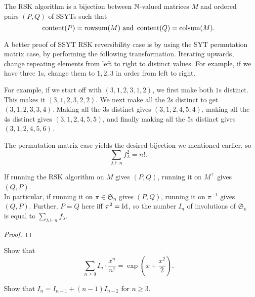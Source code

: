 	\begin{ftheo}
		The RSK algorithm is a bijection between $\mathbb{N}$-valued matrices $M$ and ordered pairs $(P,Q)$ of SSYTs such that
		\[ \operatorname{content}(P) = \operatorname{rowsum}(M) \text{ and } \operatorname{content}(Q) = \operatorname{colsum}(M). \] 
	\end{ftheo}

	A better proof of SSYT RSK reversibility case is by using the SYT permutation matrix case, by performing the following transformation. Iterating upwards, change repeating elements from left to right to distinct values. For example, if we have three $1$s, change them to $1,2,3$ in order from left to right.\\
	\begin{fex}
		For example, if we start off with $(3,1,2,3,1,2)$, we first make both $1$s distinct. This makes it $(3,1,2,3,2,2)$. We next make all the $2$s distinct to get $(3,1,2,3,3,4)$. Making all the $3$s distinct gives $(3,1,2,4,5,4)$, making all the $4$s distinct gives $(3,1,2,4,5,5)$, and finally making all the $5$s distinct gives $(3,1,2,4,5,6)$.
	\end{fex}


	The permutation matrix case yields the desired bijection we mentioned earlier, so
	\[ \sum_{\lambda \vdash n} f_\lambda^2 = n!. \]

	\begin{fprop}
		If running the RSK algorithm on $M$ gives $(P,Q)$, running it on $M^\top$ gives $(Q,P)$.\\
		In particular, if running it on $\pi \in \mathfrak{S}_n$ gives $(P,Q)$, running it on $\pi^{-1}$ gives $(Q,P)$. Further, $P = Q$ here iff $\pi^2 = \operatorname{Id}$, so the number $I_n$ of involutions of $\mathfrak{S}_n$ is equal to $\sum_{\lambda \vdash n} f_\lambda$.
	\end{fprop}
	\begin{proof}
		
	\end{proof}

	\begin{exercise}
		Show that
		\[ \sum_{n \ge 0} I_n \cdot \frac{x^n}{n!} = \exp\left( x + \frac{x^2}{2} \right). \]
	\end{exercise}
	\begin{exercise}
		Show that $I_n = I_{n-1} + (n-1) I_{n-2}$ for $n \ge 3$.
	\end{exercise}

